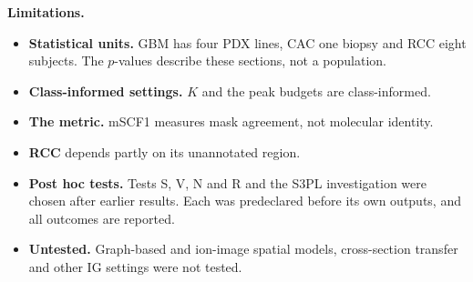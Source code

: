 \textbf{Limitations.}
\begin{itemize}
  \item \textbf{Statistical units.} GBM has four PDX lines, CAC one biopsy and
        RCC eight subjects. The $p$-values describe these sections, not a
        population.
  \item \textbf{Class-informed settings.} $K$ and the peak budgets are
        class-informed.
  \item \textbf{The metric.} mSCF1 measures mask agreement, not molecular
        identity.
  \item \textbf{RCC} depends partly on its unannotated region.
  \item \textbf{Post hoc tests.} Tests S, V, N and R and the S3PL investigation
        were chosen after earlier results. Each was predeclared before its own
        outputs, and all outcomes are reported.
  \item \textbf{Untested.} Graph-based and ion-image spatial models,
        cross-section transfer and other IG settings were not tested.
\end{itemize}
